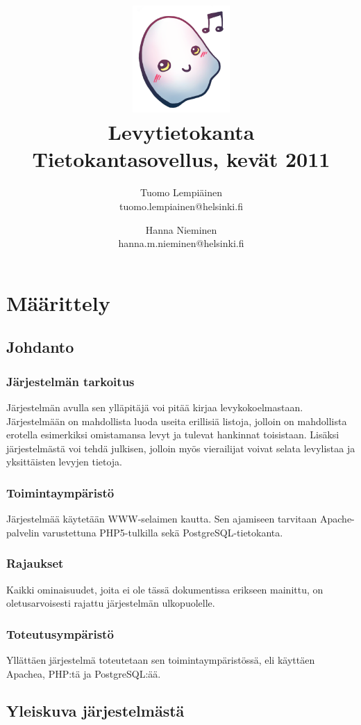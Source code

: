 \documentclass[a4paper,12pt]{report}
\title{\includegraphics[width=5em]{logo}\\\vspace{1em}Levytietokanta\\
  \large{Tietokantasovellus, kevät 2011}\\}
\author{Tuomo Lempiäinen\\tuomo.lempiainen@helsinki.fi \and
Hanna Nieminen\\hanna.m.nieminen@helsinki.fi}
\begin{document}
\maketitle

\tableofcontents

\chapter{Määrittely}

\section{Johdanto}

\subsection{Järjestelmän tarkoitus}
Järjestelmän avulla sen ylläpitäjä voi pitää kirjaa levykokoelmastaan.
Järjestelmään on mahdollista luoda useita erillisiä listoja, jolloin on
mahdollista erotella esimerkiksi omistamansa levyt ja tulevat hankinnat
toisistaan.  Lisäksi järjestelmästä voi tehdä julkisen, jolloin myös vierailijat
voivat selata levylistaa ja yksittäisten levyjen tietoja.

\subsection{Toimintaympäristö}
Järjestelmää käytetään WWW-selaimen kautta. Sen ajamiseen tarvitaan
Apache-palvelin varustettuna PHP5-tulkilla sekä PostgreSQL-tietokanta.

\subsection{Rajaukset}
Kaikki ominaisuudet, joita ei ole tässä dokumentissa erikseen mainittu, on
oletusarvoisesti rajattu järjestelmän ulkopuolelle.

\subsection{Toteutusympäristö}
Yllättäen järjestelmä toteutetaan sen toimintaympäristössä, eli käyttäen
Apachea, PHP:tä ja PostgreSQL:ää.

\section{Yleiskuva järjestelmästä}
\end{document}
